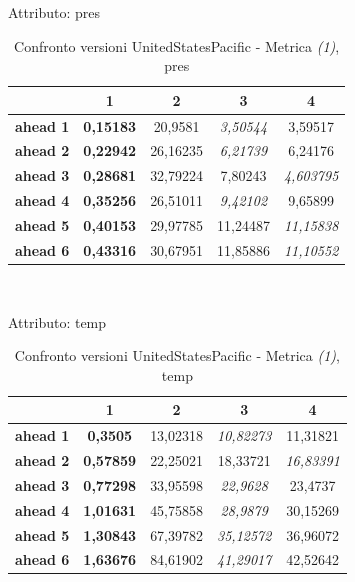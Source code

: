 \documentclass[12pt,a4paper,oneside,openright]{book}
\begin{document}
\newpage

Attributo: pres \\ 

\begin{table}[H]
\centering
\begin{tabular}{|c|c|c|c|c|}
\hline
& 1 & 2 & 3 & 4 \\
\hline
\textbf{ahead 1} & \textbf{0,15183} & 20,9581 & \textit{3,50544} & 3,59517\\
\hline
\textbf{ahead 2} & \textbf{0,22942} & 26,16235 & \textit{6,21739} & 6,24176\\
\hline
\textbf{ahead 3} & \textbf{0,28681} & 32,79224 & 7,80243 & \textit{4,603795}\\
\hline
\textbf{ahead 4} & \textbf{0,35256} & 26,51011 & \textit{9,42102} & 9,65899\\
\hline
\textbf{ahead 5} & \textbf{0,40153} & 29,97785 & 11,24487 & \textit{11,15838}\\
\hline
\textbf{ahead 6} & \textbf{0,43316} & 30,67951 & 11,85886 & \textit{11,10552}\\
\hline
\end{tabular} \\
\caption{Confronto versioni UnitedStatesPacific - Metrica \textit{(1)}, pres}
\end{table} 

\medskip

Attributo: temp \\ 

\begin{table}[H]
\centering
\begin{tabular}{|c|c|c|c|c|}
\hline
& 1 & 2 & 3 & 4 \\
\hline
\textbf{ahead 1} & \textbf{0,3505} & 13,02318 & \textit{10,82273} & 11,31821\\
\hline
\textbf{ahead 2} & \textbf{0,57859} & 22,25021 & 18,33721 & \textit{16,83391}\\
\hline
\textbf{ahead 3} & \textbf{0,77298} & 33,95598 & \textit{22,9628} & 23,4737\\
\hline
\textbf{ahead 4} & \textbf{1,01631} & 45,75858 & \textit{28,9879} & 30,15269\\
\hline
\textbf{ahead 5} & \textbf{1,30843} & 67,39782 & \textit{35,12572} & 36,96072\\
\hline
\textbf{ahead 6} & \textbf{1,63676} & 84,61902 & \textit{41,29017} & 42,52642\\
\hline
\end{tabular} \\
\caption{Confronto versioni UnitedStatesPacific - Metrica \textit{(1)}, temp}
\end{table} 
\end{document}
